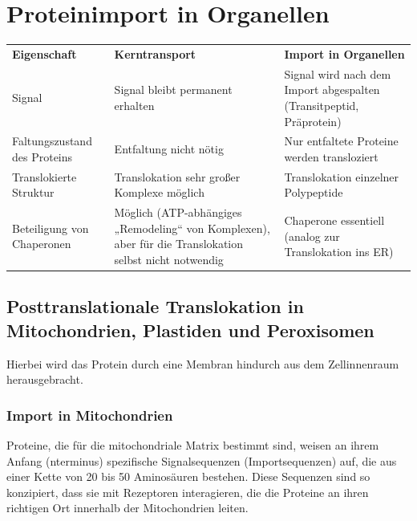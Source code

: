 

\section{Proteinimport in Organellen}\label{sec:proteinimport-in-organellen}
\begin{mytable}
    \begin{tabular}{p{3cm}p{5cm}p{5cm}}
        \textbf{Eigenschaft} & \textbf{Kerntransport} & \textbf{Import in Organellen} \\
        Signal &
        Signal bleibt permanent erhalten &
        Signal wird nach dem Import abgespalten
        (Transitpeptid, Präprotein) \\

        Faltungszustand des Proteins &
        Entfaltung nicht nötig &
        Nur entfaltete Proteine werden transloziert \\

        Translokierte Struktur &
        Translokation sehr großer Komplexe möglich &
        Translokation einzelner Polypeptide \\

        Beteiligung von Chaperonen &
        Möglich (ATP-abhängiges „Remodeling“ von Komplexen), aber für die Translokation selbst nicht notwendig
        &
        Chaperone essentiell (analog zur Translokation ins ER)
    \end{tabular}\label{tab:table6}
\end{mytable}
\subsection{Posttranslationale Translokation in Mitochondrien, Plastiden und Peroxisomen}\label{subsec:posttranslationale-translokation-in-mitochondrien-plastiden-und-peroxisomen}
Hierbei wird das Protein durch eine Membran hindurch aus dem Zellinnenraum herausgebracht. \cite{Christen2024}

\subsubsection{Import in Mitochondrien}
Proteine, die für die mitochondriale Matrix bestimmt sind, weisen an ihrem Anfang (\gls{nterminus}) spezifische
Signalsequenzen (Importsequenzen) auf, die aus einer Kette von 20 bis 50 Aminosäuren bestehen.
Diese Sequenzen sind so konzipiert, dass sie mit Rezeptoren interagieren, die die Proteine an ihren richtigen Ort innerhalb der Mitochondrien leiten.

